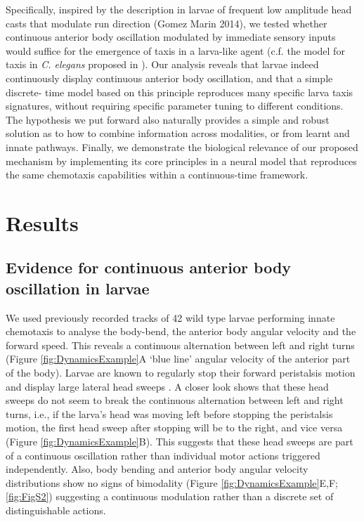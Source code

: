 \documentclass[11pt,a4paper]{article}
\begin{document}
Specifically, inspired by the description in larvae of frequent low amplitude head casts that modulate run direction (Gomez Marin 2014), we tested whether continuous anterior body oscillation modulated by immediate sensory inputs would suffice for the emergence of taxis in a larva-like agent (c.f. the model for taxis in {\it C. elegans} proposed in \citet{izquierdo2010evolution}). Our analysis reveals that larvae indeed continuously display continuous anterior body oscillation, and that a simple discrete- time model based on this principle reproduces many specific larva taxis signatures, without requiring specific parameter tuning to different conditions. The hypothesis we put forward also naturally provides a simple and robust solution as to how to combine information across modalities, or from learnt and innate pathways. Finally, we demonstrate the biological relevance of our proposed mechanism by implementing its  core principles in a neural model that reproduces the same chemotaxis capabilities within a continuous-time framework.

\section{Results}
\subsection{Evidence for continuous anterior body oscillation in larvae}
 We used previously recorded tracks of 42 wild type larvae performing innate chemotaxis \citep{gomez2012active} to analyse the body-bend, the anterior body angular velocity and the forward speed. This reveals a continuous alternation between left and right turns (Figure \ref{fig:DynamicsExample}A ‘blue line’ angular velocity of the anterior part of the body). Larvae are known to regularly stop their forward peristalsis motion and display large lateral head sweeps \citep{gomez2011active}. A closer look shows that these head sweeps do not seem to break the continuous alternation between left and right turns, i.e., if the larva’s head was moving left before stopping the peristalsis motion, the first head sweep after stopping will be to the right, and vice versa (Figure \ref{fig:DynamicsExample}B). This suggests that these head sweeps are part of a continuous oscillation rather than individual motor actions triggered independently. Also, body bending and anterior body angular velocity distributions show no signs of bimodality (Figure \ref{fig:DynamicsExample}E,F; \ref{fig:FigS2}) suggesting a continuous modulation rather than a discrete set of distinguishable actions. 
\end{document}
